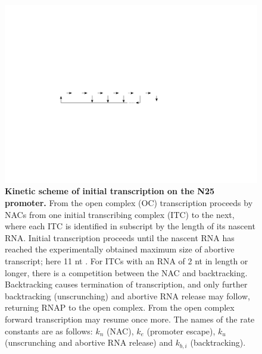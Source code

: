\begin{figure}[h]
    \begin{center}
      \includegraphics{../illustrations/model_and_rates_mini}
    \end{center}
  \caption{{\bf Kinetic scheme of initial transcription on the N25 promoter.}
    From the open complex (OC) transcription proceeds by NACs from one initial
    transcribing complex (ITC) to the next, where each ITC is identified in
    subscript by the length of its nascent RNA. Initial transcription proceeds
    until the nascent RNA has reached the experimentally obtained maximum size
    of abortive transcript; here 11 nt \cite{hsu_initial_2006}. For ITCs with
    an RNA of 2 nt in length or longer, there is a competition between the
    NAC and backtracking. Backtracking causes termination of transcription,
    and only further backtracking (unscrunching) and abortive RNA release may
    follow, returning RNAP to the open complex. From the open complex forward
    transcription may resume once more. The names of the rate constants are as
    follows: $k_n$ (NAC), $k_e$ (promoter escape), $k_u$ (unscrunching and
    abortive RNA release) and $k_{b,i}$ (backtracking).}
    \label{fig:model_and_rates}
\end{figure}

